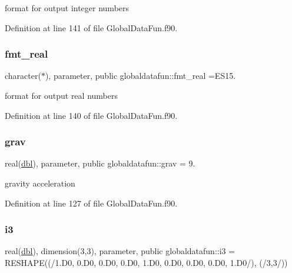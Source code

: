 format for output integer numbers 



Definition at line 141 of file Global\+Data\+Fun.\+f90.

\mbox{\label{namespaceglobaldatafun_ab9b7950cc6b98bba6c90ccbc0bf16763}} 
\subsubsection{\texorpdfstring{fmt\+\_\+real}{fmt\_real}}
{\footnotesize\ttfamily character($\ast$), parameter, public globaldatafun\+::fmt\+\_\+real =\textquotesingle{}E\+S15.\textquotesingle{}}



format for output real numbers 



Definition at line 140 of file Global\+Data\+Fun.\+f90.

\mbox{\label{namespaceglobaldatafun_a6ddc394879657b50856a10648f3af6bd}} 
\subsubsection{\texorpdfstring{grav}{grav}}
{\footnotesize\ttfamily real(\hyperlink{namespaceglobaldatafun_a5008801201dd34f2af8eae07756befb4}{dbl}), parameter, public globaldatafun\+::grav = 9.}



gravity acceleration 



Definition at line 127 of file Global\+Data\+Fun.\+f90.

\mbox{\label{namespaceglobaldatafun_abe3df2088f071e903ebdcf4734f6dc27}} 
\subsubsection{\texorpdfstring{i3}{i3}}
{\footnotesize\ttfamily real(\hyperlink{namespaceglobaldatafun_a5008801201dd34f2af8eae07756befb4}{dbl}), dimension(3,3), parameter, public globaldatafun\+::i3 = R\+E\+S\+H\+A\+PE((/1.D0, 0.D0, 0.D0, 0.D0, 1.D0, 0.D0, 0.D0, 0.D0, 1.D0/), (/3,3/))}



